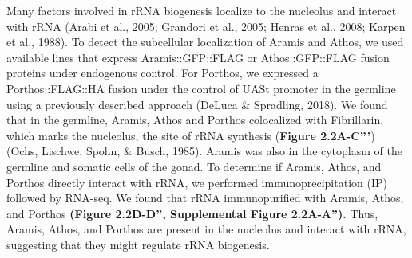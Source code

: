 \documentclass[12pt,twoside]{reedthesis}
\begin{document}
Many factors involved in rRNA biogenesis localize to the nucleolus and
interact with rRNA (Arabi et al., 2005; Grandori et al., 2005; Henras et al., 2008; Karpen et al., 1988). To detect
the subcellular localization of Aramis and Athos, we used available
lines that express Aramis::GFP::FLAG or Athos::GFP::FLAG fusion proteins
under endogenous control. For Porthos, we expressed a Porthos::FLAG::HA
fusion under the control of UASt promoter in the germline using a
previously described approach (DeLuca \& Spradling, 2018).
We found that in the germline, Aramis, Athos and Porthos colocalized
with Fibrillarin, which marks the nucleolus, the site of rRNA synthesis
(\textbf{Figure 2.2A-C'''}) (Ochs, Lischwe, Spohn, \& Busch, 1985). Aramis was
also in the cytoplasm of the germline and somatic cells of the gonad. To
determine if Aramis, Athos, and Porthos directly interact with rRNA, we
performed immunoprecipitation (IP) followed by RNA-seq. We found that
rRNA immunopurified with Aramis, Athos, and Porthos \textbf{(Figure 2.2D-D'',
Supplemental Figure 2.2A-A'').} Thus, Aramis, Athos, and Porthos are present in the
nucleolus and interact with rRNA, suggesting that they might regulate
rRNA biogenesis.
\end{document}
